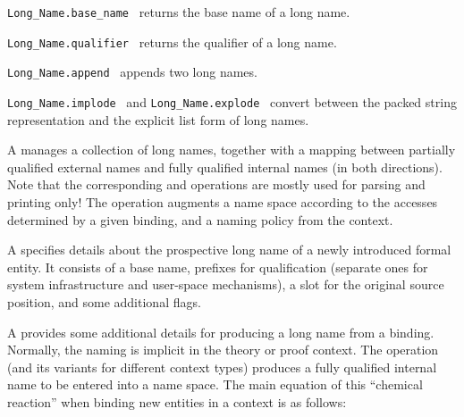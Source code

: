 \begin{isabellebody}
\begin{isamarkuptext}
  \begin{description}

  \item \verb|Long_Name.base_name|~ returns the base name
  of a long name.

  \item \verb|Long_Name.qualifier|~ returns the qualifier
  of a long name.

  \item \verb|Long_Name.append|~ appends two long
  names.

  \item \verb|Long_Name.implode|~ and \verb|Long_Name.explode|~ convert between the packed string
  representation and the explicit list form of long names.

  \end{description}%
\end{isamarkuptext}%
\isamarkuptrue%
%
\endisatagmlref
{\isafoldmlref}%
%
\isadelimmlref
%
\endisadelimmlref
%
\isamarkuptrue%
%
\begin{isamarkuptext}%
A  manages a collection of long names,
  together with a mapping between partially qualified external names
  and fully qualified internal names (in both directions).  Note that
  the corresponding  and  operations
  are mostly used for parsing and printing only!  The  operation augments a name space according to the accesses
  determined by a given binding, and a naming policy from the context.

  \medskip A  specifies details about the prospective
  long name of a newly introduced formal entity.  It consists of a
  base name, prefixes for qualification (separate ones for system
  infrastructure and user-space mechanisms), a slot for the original
  source position, and some additional flags.

  \medskip A  provides some additional details for
  producing a long name from a binding.  Normally, the naming is
  implicit in the theory or proof context.  The 
  operation (and its variants for different context types) produces a
  fully qualified internal name to be entered into a name space.  The
  main equation of this ``chemical reaction'' when binding new
  entities in a context is as follows:


\end{isamarkuptext}
\end{isabellebody}
